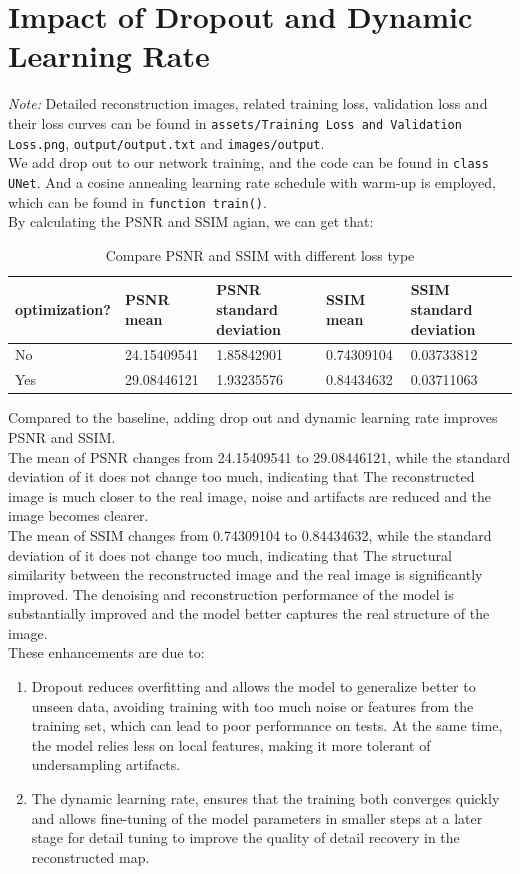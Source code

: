 \documentclass{article}
\begin{document}
\section{Impact of Dropout and Dynamic Learning Rate}
\textit{Note: }Detailed reconstruction images, related training loss, validation loss and their
 loss curves can be found in \texttt{assets/Training Loss and Validation Loss.png}, 
 \texttt{output/output.txt} and \texttt{images/output}.\\
We add drop out to our network training, and the code can be found in \texttt{class UNet}.
And a cosine annealing learning rate schedule with warm-up is employed, which can be
found in \texttt{function train()}.\\
By calculating the PSNR and SSIM agian, we can get that:
\begin{table}[H]
  \caption{Compare PSNR and SSIM with different loss type}
  \centering
  \begin{tabular}{lllll}
    \toprule
    \cmidrule(r){1-2}
    optimization?     & PSNR mean     & PSNR standard deviation & SSIM mean  & SSIM standard deviation \\
    \midrule
    No & 24.15409541  & 1.85842901  & 0.74309104 &  0.03733812  \\
    Yes     & 29.08446121 & 1.93235576  & 0.84434632 & 0.03711063  \\
    \bottomrule
  \end{tabular}
\end{table}
Compared to the baseline, adding drop out and dynamic learning rate improves PSNR and SSIM.\\
The mean of PSNR changes from 24.15409541 to 29.08446121, while the standard deviation of it
does not change too much, indicating that The reconstructed image is much closer to the real 
image, noise and artifacts are reduced and the image becomes clearer.\\
The mean of SSIM changes from 0.74309104 to 0.84434632, while the standard deviation of it
does not change too much, indicating that The structural similarity between the reconstructed 
image and the real image is significantly improved. The denoising and reconstruction performance 
of the model is substantially improved and the model better captures the real structure of the image.\\
These enhancements are due to:
\begin{enumerate}
  \item Dropout reduces overfitting and allows the model to generalize better to unseen data, 
      avoiding training with too much noise or features from the training set, which can lead 
      to poor performance on tests. At the same time, the model relies less on local features, 
      making it more tolerant of undersampling artifacts.
  \item The dynamic learning rate, ensures that the training both converges quickly and allows 
      fine-tuning of the model parameters in smaller steps at a later stage for detail tuning 
      to improve the quality of detail recovery in the reconstructed map.
\end{enumerate}
\end{document}
